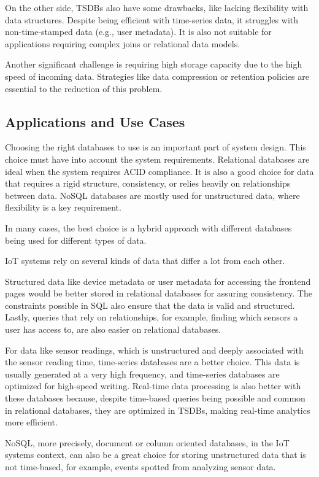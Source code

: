 On the other side, \gls{TSDB}s also have some drawbacks, like lacking flexibility
with data structures.
Despite being efficient with time-series data, it struggles with non-time-stamped
data (e.g., user metadata). It is also not suitable for applications requiring
complex joins or relational data models.

Another significant challenge is requiring high storage capacity due to the
high speed of incoming data.
Strategies like data compression or retention policies
are essential to the reduction of this problem.

\subsection{Applications and Use Cases}
Choosing the right databases to use is an important part of system design. This
choice must have into account the system requirements. Relational databases are
ideal when the system requires \gls{ACID} compliance. It is also a good choice for
data that requires a rigid structure, consistency, or relies heavily on
relationships between data. \gls{NoSQL} databases are mostly used for unstructured
data, where flexibility is a key requirement.

In many cases, the best choice is a hybrid approach with different databases
being used for different types of data.

\gls{IoT} systems rely on several kinds of data that differ a lot from each other.

Structured data like device metadata or user metadata for accessing the
frontend pages would be better stored in relational databases for assuring
consistency. The constraints possible in \gls{SQL} also ensure that the data is valid
and structured. Lastly, queries that rely on relationships, for example, finding
which sensors a user has access to, are also easier on relational databases.

For data like sensor readings, which is unstructured and deeply associated with
the sensor reading time, time-series databases are a better choice. This data
is usually generated at a very high frequency, and time-series databases are
optimized for high-speed writing. Real-time data processing is also better with
these databases because, despite time-based queries being possible and common in
relational databases, they are optimized in \gls{TSDB}s, making
real-time analytics more efficient.

\gls{NoSQL}, more precisely, document or column oriented databases, in the \gls{IoT} systems
context, can also be a great choice for storing unstructured data that is not
time-based, for example, events spotted from analyzing sensor data.

